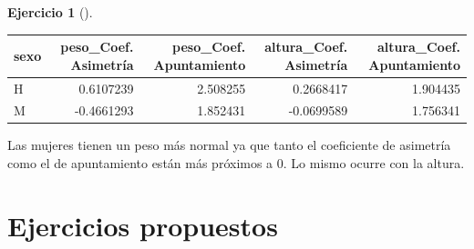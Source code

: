 \documentclass[
  a4paper,
]{scrreport}
\theoremstyle{definition}
\newtheorem{exercise}{Ejercicio}[chapter]
\theoremstyle{remark}
\begin{document}
\begin{exercise}[]
\begin{enumerate}
\begin{tcolorbox}
  \begin{table}
  \centering
  \begin{tabular}{l|r|r|r|r}
  \hline
  sexo & peso\_Coef. Asimetría & peso\_Coef. Apuntamiento & altura\_Coef. Asimetría & altura\_Coef. Apuntamiento\\
  \hline
  H & 0.6107239 & 2.508255 & 0.2668417 & 1.904435\\
  \hline
  M & -0.4661293 & 1.852431 & -0.0699589 & 1.756341\\
  \hline
  \end{tabular}
  \end{table}

  Las mujeres tienen un peso más normal ya que tanto el coeficiente de
  asimetría como el de apuntamiento están más próximos a 0. Lo mismo
  ocurre con la altura.

  \end{tcolorbox}
\end{enumerate}

\end{exercise}

\section{Ejercicios propuestos}\label{ejercicios-propuestos-2}
\end{document}
